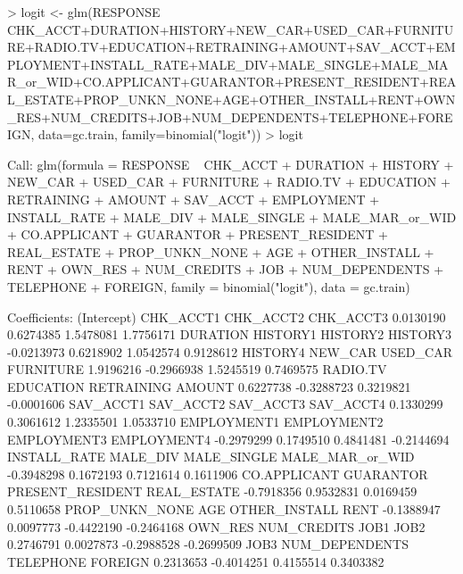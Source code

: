 \documentclass{article}
\begin{document}
\begin{Schunk}
\begin{Sinput}
> logit <- glm(RESPONSE ~ CHK_ACCT+DURATION+HISTORY+NEW_CAR+USED_CAR+FURNITURE+RADIO.TV+EDUCATION+RETRAINING+AMOUNT+SAV_ACCT+EMPLOYMENT+INSTALL_RATE+MALE_DIV+MALE_SINGLE+MALE_MAR_or_WID+CO.APPLICANT+GUARANTOR+PRESENT_RESIDENT+REAL_ESTATE+PROP_UNKN_NONE+AGE+OTHER_INSTALL+RENT+OWN_RES+NUM_CREDITS+JOB+NUM_DEPENDENTS+TELEPHONE+FOREIGN, data=gc.train, family=binomial("logit"))
> logit
\end{Sinput}
\begin{Soutput}
Call:  glm(formula = RESPONSE ~ CHK_ACCT + DURATION + HISTORY + NEW_CAR + 
    USED_CAR + FURNITURE + RADIO.TV + EDUCATION + RETRAINING + 
    AMOUNT + SAV_ACCT + EMPLOYMENT + INSTALL_RATE + MALE_DIV + 
    MALE_SINGLE + MALE_MAR_or_WID + CO.APPLICANT + GUARANTOR + 
    PRESENT_RESIDENT + REAL_ESTATE + PROP_UNKN_NONE + AGE + OTHER_INSTALL + 
    RENT + OWN_RES + NUM_CREDITS + JOB + NUM_DEPENDENTS + TELEPHONE + 
    FOREIGN, family = binomial("logit"), data = gc.train)

Coefficients:
     (Intercept)         CHK_ACCT1         CHK_ACCT2         CHK_ACCT3  
       0.0130190         0.6274385         1.5478081         1.7756171  
        DURATION          HISTORY1          HISTORY2          HISTORY3  
      -0.0213973         0.6218902         1.0542574         0.9128612  
        HISTORY4           NEW_CAR          USED_CAR         FURNITURE  
       1.9196216        -0.2966938         1.5245519         0.7469575  
        RADIO.TV         EDUCATION        RETRAINING            AMOUNT  
       0.6227738        -0.3288723         0.3219821        -0.0001606  
       SAV_ACCT1         SAV_ACCT2         SAV_ACCT3         SAV_ACCT4  
       0.1330299         0.3061612         1.2335501         1.0533710  
     EMPLOYMENT1       EMPLOYMENT2       EMPLOYMENT3       EMPLOYMENT4  
      -0.2979299         0.1749510         0.4841481        -0.2144694  
    INSTALL_RATE          MALE_DIV       MALE_SINGLE   MALE_MAR_or_WID  
      -0.3948298         0.1672193         0.7121614         0.1611906  
    CO.APPLICANT         GUARANTOR  PRESENT_RESIDENT       REAL_ESTATE  
      -0.7918356         0.9532831         0.0169459         0.5110658  
  PROP_UNKN_NONE               AGE     OTHER_INSTALL              RENT  
      -0.1388947         0.0097773        -0.4422190        -0.2464168  
         OWN_RES       NUM_CREDITS              JOB1              JOB2  
       0.2746791         0.0027873        -0.2988528        -0.2699509  
            JOB3    NUM_DEPENDENTS         TELEPHONE           FOREIGN  
       0.2313653        -0.4014251         0.4155514         0.3403382  


\end{Soutput}
\end{Schunk}
\end{document}
